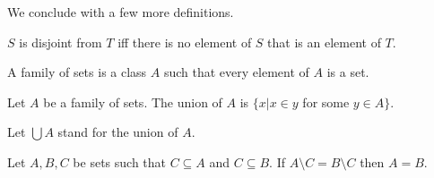 \documentclass{article}
\begin{document}
%
We conclude with a few more definitions.
%
\begin{forthel}
  \begin{definition}
    $S$ is disjoint from $T$ iff there is no element of $S$ that is an element
    of $T$.
  \end{definition}

  \begin{definition}
    A family of sets is a class $A$ such that every element of
$A$ is a set.
  \end{definition}

\begin{definition}
Let $A$ be a family of sets. The union of $A$
is $ \{x | x \in y$ for some $y \in A\}$.
\end{definition}

Let $\bigcup A$ stand for the union of $A$.


\begin{lemma}
Let $A,B,C$ be sets such that $C \subseteq A$ and $C \subseteq B$.
If $A \setminus C = B \setminus C$ then $A = B$.
\end{lemma}


\end{forthel}
%
\end{document}
